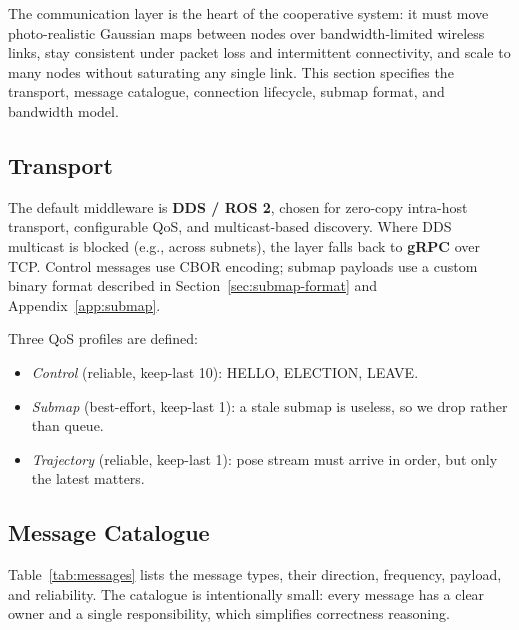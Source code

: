 \label{sec:communication}

The communication layer is the heart of the cooperative system: it must move
photo-realistic Gaussian maps between nodes over bandwidth-limited wireless
links, stay consistent under packet loss and intermittent connectivity, and
scale to many nodes without saturating any single link. This section specifies
the transport, message catalogue, connection lifecycle, submap format, and
bandwidth model.

\subsection{Transport}
\label{sec:transport}

The default middleware is \textbf{DDS / ROS 2}, chosen for zero-copy
intra-host transport, configurable QoS, and multicast-based discovery. Where
DDS multicast is blocked (e.g., across subnets), the layer falls back to
\textbf{gRPC} over TCP. Control messages use CBOR encoding; submap payloads use
a custom binary format described in Section~\ref{sec:submap-format} and
Appendix~\ref{app:submap}.

Three QoS profiles are defined:
\begin{itemize}
  \item \emph{Control} (reliable, keep-last 10): HELLO, ELECTION, LEAVE.
  \item \emph{Submap} (best-effort, keep-last 1): a stale submap is useless, so
    we drop rather than queue.
  \item \emph{Trajectory} (reliable, keep-last 1): pose stream must arrive in
    order, but only the latest matters.
\end{itemize}

\subsection{Message Catalogue}
\label{sec:messages}

Table~\ref{tab:messages} lists the message types, their direction, frequency,
payload, and reliability. The catalogue is intentionally small: every message
has a clear owner and a single responsibility, which simplifies correctness
reasoning.

